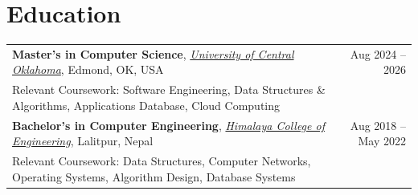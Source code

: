 \documentclass[a4paper,10pt]{article}
\begin{document}
\section{Education}
\begin{tabularx}{\linewidth}{@{}X r@{}}
\textbf{Master’s in Computer Science}, 
\href{https://www.uco.edu/}{\textit{University of Central Oklahoma}}, Edmond, OK, USA 
& Aug 2024 -- 2026 \\
Relevant Coursework: Software Engineering, Data Structures \& Algorithms, Applications Database, Cloud Computing & \\[-2pt]

\textbf{Bachelor’s in Computer Engineering}, 
\href{https://www.hcoe.edu.np/}{\textit{Himalaya College of Engineering}}, Lalitpur, Nepal 
& Aug 2018 -- May 2022 \\
Relevant Coursework: Data Structures, Computer Networks, Operating Systems, Algorithm Design, Database Systems & \\
\end{tabularx}
\end{document}
